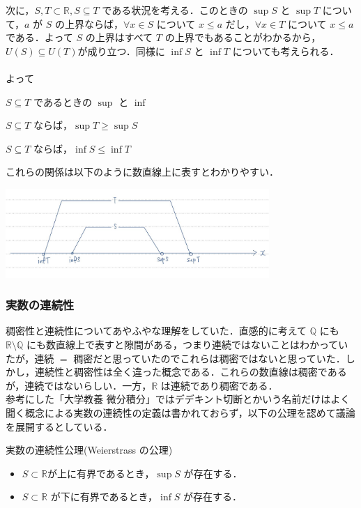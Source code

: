 \documentclass[xelatex,ja=standard,jafont=noto]{bxjsarticle}
\begin{document}
 次に，$S, T \subset \mathbb{R}, S \subseteq T$ である状況を考える．このときの $\sup S$ と $\sup T$ について，$a $ が $S$ の上界ならば，$\forall x \in S$ について $x \leq a$ だし，$\forall x \in T$ について $x \leq a$ である．よって $S$ の上界はすべて $T$ の上界でもあることがわかるから，$U(S) \subseteq U(T)$が成り立つ．同様に $\inf S$ と $\inf T$ についても考えられる．\\ \\
 よって
 
 \begin{tcb}{$S \subseteq T$ であるときの $\sup$ と $\inf$}{}
  \centerline{$S \subseteq T$ ならば，$\sup T \geq \sup S$}
  \centerline{$S \subseteq T$ ならば，$\inf S \leq \inf T$}
 \end{tcb}
これらの関係は以下のように数直線上に表すとわかりやすい．

\centerline{\includegraphics[width= 10cm]{./GYPtkDEb.jpg}}
   
   \subsubsection{実数の連続性}
   稠密性と連続性についてあやふやな理解をしていた．直感的に考えて $\mathbb{Q}$ にも $\mathbb{R} \setminus \mathbb{Q}$ にも数直線上で表すと隙間がある，つまり連続ではないことはわかっていたが，連続 $=$ 稠密だと思っていたのでこれらは稠密ではないと思っていた．しかし，連続性と稠密性は全く違った概念である．これらの数直線は稠密であるが，連続ではないらしい．一方，$\mathbb{R}$ は連続であり稠密である．\\
   参考にした「大学教養 微分積分」ではデデキント切断とかいう名前だけはよく聞く概念による実数の連続性の定義は書かれておらず，以下の公理を認めて議論を展開するとしている．

   \begin{axiom}{実数の連続性公理(Weierstrass の公理)}{}
    \begin{itemize}
     \item $S \subset \mathbb{R}$が上に有界であるとき，$\sup S$ が存在する．
     \item $S \subset \mathbb{R}$ が下に有界であるとき，$\inf S$ が存在する．
    \end{itemize}

   \end{axiom}
\end{document}
